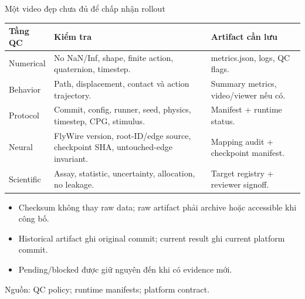 \documentclass[10pt,aspectratio=169]{beamer}
\newcommand{\source}[1]{\par\vfill{\fontsize{6.0}{7}\selectfont\color{gray}Nguồn: #1\par}}
\newcommand{\smallgap}{\vspace{0.18cm}}
\begin{document}
\begin{frame}{Một video đẹp chưa đủ để chấp nhận rollout}
\renewcommand{\arraystretch}{1.28}\scriptsize
\begin{tabular}{@{}L{2.2cm}L{8.1cm}L{4.0cm}@{}}
\toprule
\textbf{Tầng QC} & \textbf{Kiểm tra} & \textbf{Artifact cần lưu}\\\midrule
Numerical & No NaN/Inf, shape, finite action, quaternion, timestep. & metrics.json, logs, QC flags.\\
Behavior & Path, displacement, contact và action trajectory. & Summary metrics, video/viewer nếu có.\\
Protocol & Commit, config, runner, seed, physics, timestep, CPG, stimulus. & Manifest + runtime status.\\
Neural & FlyWire version, root-ID/edge source, checkpoint SHA, untouched-edge invariant. & Mapping audit + checkpoint manifest.\\
Scientific & Assay, statistic, uncertainty, allocation, no leakage. & Target registry + reviewer signoff.\\\bottomrule
\end{tabular}
\smallgap
\begin{itemize}\setlength\itemsep{4pt}\small
\item Checksum không thay raw data; raw artifact phải archive hoặc accessible khi công bố.
\item Historical artifact ghi original commit; current result ghi current platform commit.
\item Pending/blocked được giữ nguyên đến khi có evidence mới.
\end{itemize}
\source{QC policy; runtime manifests; platform contract.}
\end{frame}
\end{document}
